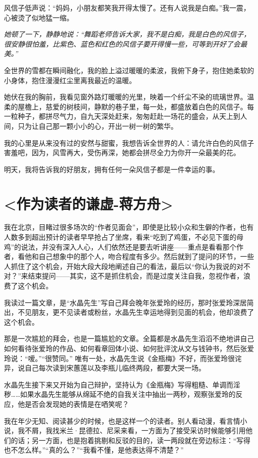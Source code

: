 \documentclass[UTF8,a4paper,8pt]{ctexbook}
\begin{document}
		风信子低声说：“妈妈，小朋友都笑我开得太慢了。还有人说我是白痴。”我一震，心被烫了似地猛一缩。
		
		\textit{她顿了一下，静静地说：“舞蹈老师告诉大家，我不是白痴，我是白色的风信子，很安静很怕羞，比紫色、蓝色和红色的风信子要开得慢一些，可等到开好了会最美。”}
		
		全世界的雪都在瞬间融化，我的脸上溢过暖暖的柔波，我俯下身子，抱住她柔软的小身体，抱住漫漫红尘里离我最近的温暖。
		
		她伏在我的胸前，我看见窗外路灯暖暖的光里，映着一个纤尘不染的琉璃世界。温柔的屋檐上，慈爱的树枝间，静默的巷子里，每一处，都盛放着白色的风信子。每一粒种子，都拼尽气力，自九天深处赶来，匆匆赶赴一场花的盛会，从天上到人间，只为让自己那一颗小小的心，开出一树一树的繁华。
		
		我的心里是从来没有过的安然与甜蜜，我想告诉全世界的人：请允许白色的风信子害羞吧，因为，风雪再大，受伤再深，她都会拼尽全力为你开一朵最美的花。
		
		明天，我将告诉我的好朋友，拥有任何一朵风信子都是一件幸运的事。


\newpage
\section{<作为读者的谦虚-蒋方舟>}
		我在北京，目睹过很多场次的“作者见面会”，即使是比较小众和生僻的作者，也有人数多到超出预计的读者早早抢占了坐席，看来“吃到了鸡蛋，不必见下蛋的母鸡”的说法，并没有深入人心，人们依然还是要去听讲座——重点是看看那个作者，看他和自己想象中的那个人，吻合程度有多少。然后就到了提问的环节，一些人抓住了这个机会，开始大段大段地阐述自己的看法，最后以“你认为我说的对不对？”来结束提问——其实，这不是抓住机会，而是过度关注自我，忽视作者，浪费了这个机会。
		
		我读过一篇文章，是“水晶先生”写自己拜会晚年张爱玲的经历，那时张爱玲深居简出，不见朋友，更不见读者或粉丝，水晶先生幸运地得到见面的机会，他却浪费了这个机会。
		
		那是一次尴尬的拜会，也是一篇尴尬的文章。全篇都是水晶先生滔滔不绝地讲自己如何看待张爱玲的作品、如何看章回体小说、如何批评沈从文与钱钟书，然后张爱玲说：“嗳。”“很赞同。” 唯有一处，水晶先生说《金瓶梅》不好，而张爱玲很诧异，说自己每次读到宋蕙莲以及李瓶儿临终两段，都要大哭一场。
		
		水晶先生接下来又开始为自己辩护，坚持认为《金瓶梅》写得粗糙、单调而淫秽……如果水晶先生能够从绵延不绝的自我关注中抽出一两秒，观察张爱玲的反应，他是否会发现她的表情是在哂笑呢？
		
		我在年少无知、阅读甚少的时候，也是这样一个的读者。别人看动漫，看言情小说，我不屑，我找米兰·昆德拉、尼采来看，一方面为了接受采访时候能够引用他们的话；另一方面，也是抱着挑剔和反驳的目的，读一两段就在旁边标注：“写得也不怎么样。”“真的么？”“我看不懂，是他表达得不清楚？”
		
\end{document}
